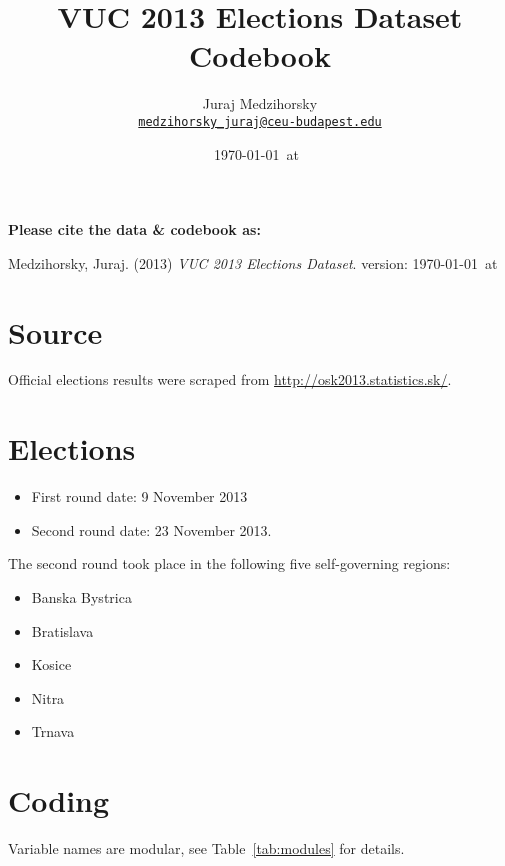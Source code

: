 \documentclass[11pt, a4paper]{article}
\title{VUC 2013 Elections Dataset Codebook}
\author{
	Juraj Medzihorsky \\
	\href{mailto:medzihorsky_juraj@ceu-budapest.edu}{\texttt{medzihorsky\_juraj@ceu-budapest.edu}}
}
\date{\ddmmyyyydate\today~at~\currenttime}
\begin{document}
\maketitle

\noindent
\textbf{Please cite the data \& codebook as:}

\noindent
Medzihorsky, Juraj. (2013) \textsl{VUC 2013 Elections Dataset}. version: \ddmmyyyydate\today~at~\currenttime

\tableofcontents

\section{Source}

Official elections results were scraped from \href{http://osk2013.statistics.sk/}{http://osk2013.statistics.sk/}.


\section{Elections}

\begin{itemize}
	\item	First round date:  9 November 2013
	\item	Second round date:  23 November 2013.
\end{itemize}

The second round took place in the following five
self-governing regions:

\begin{itemize}
	\item	Banska Bystrica		
	\item	Bratislava
	\item	Kosice
	\item	Nitra
	\item	Trnava
\end{itemize}


\section{Coding}

Variable names are modular, see Table~\ref{tab:modules} for details.
\end{document}
